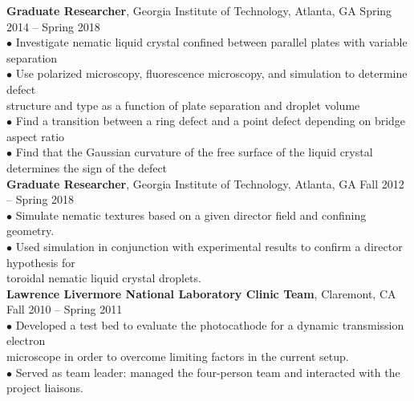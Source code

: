 \documentclass[10pt]{article}
\begin{document}
{\bf Graduate Researcher}, Georgia Institute of Technology, Atlanta, GA \hfill Spring 2014 -- Spring 2018\\
\hspace*{10pt}$\bullet$ Investigate nematic liquid crystal confined between parallel plates with variable separation\\
\hspace*{10pt}$\bullet$ Use polarized microscopy, fluorescence microscopy, and simulation to determine defect \\ \hspace*{15pt} structure and type as a function of plate separation and droplet volume\\
\hspace*{10pt}$\bullet$ Find a transition between a ring defect and a point defect depending on bridge aspect ratio\\
\hspace*{10pt}$\bullet$ Find that the Gaussian curvature of the free surface of the liquid crystal determines the sign of the defect\\


{\bf Graduate Researcher}, Georgia Institute of Technology, Atlanta, GA \hfill Fall 2012 -- Spring 2018\\
\hspace*{10pt}$\bullet$ Simulate nematic textures based on a given director field and confining geometry.\\
\hspace*{10pt}$\bullet$ Used simulation in conjunction with experimental results to confirm a director hypothesis for \\ \hspace*{15pt} toroidal nematic liquid crystal droplets.\\


{\bf Lawrence Livermore National Laboratory Clinic Team}, Claremont, CA \hfill Fall 2010 -- Spring 2011\\
\hspace*{10pt}$\bullet$ Developed a test bed to evaluate the photocathode for a dynamic transmission electron \\ \hspace*{15pt} microscope in order to overcome limiting factors in the current setup.\\
\hspace*{10pt}$\bullet$ Served as team leader: managed the four-person team and interacted with the project liaisons.\\
\end{document}
